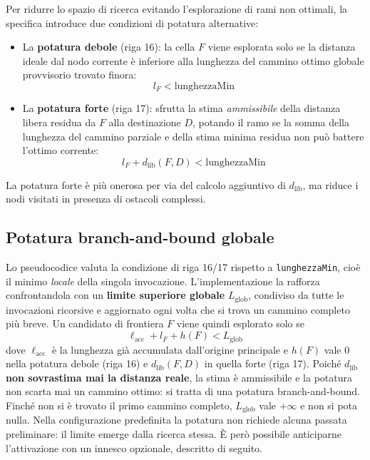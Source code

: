 Per ridurre lo spazio di ricerca evitando l'esplorazione di rami non ottimali, la specifica introduce due condizioni di potatura alternative:
\begin{itemize}
    \item La \textbf{potatura debole} (riga 16): la cella $F$ viene esplorata solo se la distanza ideale dal nodo corrente è inferiore alla lunghezza del cammino ottimo globale provvisorio trovato finora:
    \begin{equation}
    l_F < \text{lunghezzaMin}
    \label{eq:pruning_weak}
    \end{equation}
    \item La \textbf{potatura forte} (riga 17): sfrutta la stima \textit{ammissibile} della distanza libera residua da $F$ alla destinazione $D$, potando il ramo se la somma della lunghezza del cammino parziale e della stima minima residua non può battere l'ottimo corrente:
    \begin{equation}
    l_F + d_{\text{lib}}(F, D) < \text{lunghezzaMin}
    \label{eq:pruning_strong}
    \end{equation}
\end{itemize}

La potatura forte è più onerosa per via del calcolo aggiuntivo di $d_{\text{lib}}$, ma riduce i nodi visitati in presenza di ostacoli complessi.

\subsection{Potatura branch-and-bound globale}

Lo pseudocodice valuta la condizione di riga 16/17 rispetto a \texttt{lunghezzaMin}, cioè il minimo \emph{locale} della singola invocazione. L'implementazione la rafforza confrontandola con un \textbf{limite superiore globale} $L_{\text{glob}}$, condiviso da tutte le invocazioni ricorsive e aggiornato ogni volta che si trova un cammino completo più breve. Un candidato di frontiera $F$ viene quindi esplorato solo se
\begin{equation}
\ell_{\text{acc}} + l_F + h(F) < L_{\text{glob}}
\label{eq:branch_and_bound}
\end{equation}
dove $\ell_{\text{acc}}$ è la lunghezza già accumulata dall'origine principale e $h(F)$ vale $0$ nella potatura debole (riga 16) e $d_{\text{lib}}(F,D)$ in quella forte (riga 17). Poiché $d_{\text{lib}}$ \textbf{non sovrastima mai la distanza reale}, la stima è ammissibile e la potatura non scarta mai un cammino ottimo: si tratta di una potatura branch-and-bound. Finché non si è trovato il primo cammino completo, $L_{\text{glob}}$ vale $+\infty$ e non si pota nulla. Nella configurazione predefinita la potatura non richiede alcuna passata preliminare: il limite emerge dalla ricerca stessa. È però possibile anticiparne l'attivazione con un innesco opzionale, descritto di seguito.

